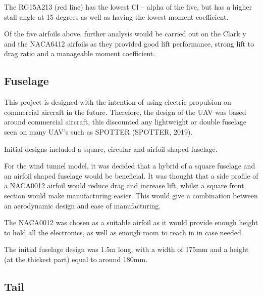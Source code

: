 \documentclass[../../main.tex]{subfiles}
\begin{document}
The RG15A213 (red line) has the lowest Cl – alpha of the five, but has a higher stall angle at 15 degrees as well as having the lowest moment coefficient.

Of the five airfoils above, further analysis would be carried out on the Clark y and the NACA6412 airfoils as they provided good lift performance, strong lift to drag ratio and a manageable moment coefficient.


\subsection{Fuselage} \label{sec:design-process:initial-designs:fuselage}

This project is designed with the intention of using electric propulsion on commercial aircraft in the future.
Therefore, the design of the UAV was based around commercial aircraft, this discounted any lightweight or double fuselage seen on many UAV’s such as SPOTTER (SPOTTER, 2019). 

Initial designs included a square, circular and airfoil shaped fuselage.



For the wind tunnel model, it was decided that a hybrid of a square fuselage and an airfoil shaped fuselage would be beneficial.
It was thought that a side profile of a NACA0012 airfoil would reduce drag and increase lift, whilst a square front section would make manufacturing easier.
This would give a combination between an aerodynamic design and ease of manufacturing.  

The NACA0012 was chosen as a suitable airfoil as it would provide enough height to hold all the electronics, as well as enough room to reach in in case needed. 

The initial fuselage design was 1.5m long, with a width of 175mm and a height (at the thickest part) equal to around 180mm. 

\subsection{Tail} \label{sec:design-process:initial-designs:tail}
\end{document}
